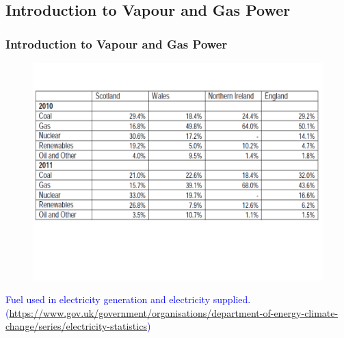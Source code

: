 \documentclass[10pt,compress]{beamer}
\begin{document}
\subsection{Introduction to Vapour and Gas Power}

\begin{frame}
 \frametitle{Introduction to Vapour and Gas Power}
    \begin{figure}%
     \begin{center}
      \includegraphics[width=9.cm,clip]{./Pics/Energy_Share_UK}
     \end{center}
    \end{figure}
\vspace{-2cm}
\textcolor{blue}{Fuel used in electricity generation and electricity supplied. (\href{https://www.gov.uk/government/organisations/department-of-energy-climate-change/series/electricity-statistics}{https://www.gov.uk/government/organisations/department-of-energy-climate-change/series/electricity-statistics})}
 \normalsize
\end{frame}
\end{document}
